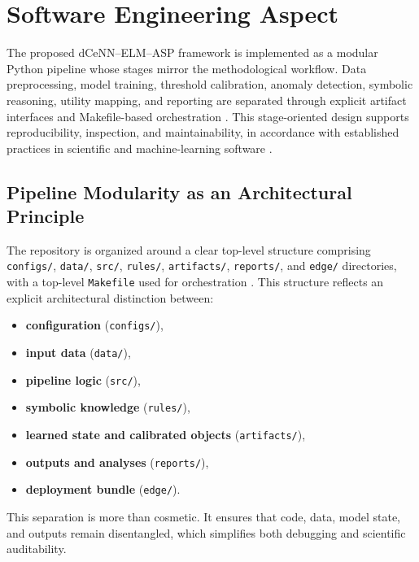 
\section{Software Engineering Aspect}
\label{sec:software_engineering_aspect}

The proposed dCeNN--ELM--ASP framework is implemented as a modular Python pipeline whose stages mirror the methodological workflow. Data preprocessing, model training, threshold calibration, anomaly detection, symbolic reasoning, utility mapping, and reporting are separated through explicit artifact interfaces and Makefile-based orchestration \cite{repo_thesis_grid_anomaly}. This stage-oriented design supports reproducibility, inspection, and maintainability, in accordance with established practices in scientific and machine-learning software \cite{wilson2014best,wilson2017good,elmenreich:repoducibility, bousbiat:TII2022,sculley2015debt}.

\subsection{Pipeline Modularity as an Architectural Principle}

The repository is organized around a clear top-level structure comprising \texttt{configs/}, \texttt{data/}, \texttt{src/}, \texttt{rules/}, \texttt{artifacts/}, \texttt{reports/}, and \texttt{edge/} directories, with a top-level \texttt{Makefile} used for orchestration \cite{repo_thesis_grid_anomaly}. This structure reflects an explicit architectural distinction between:
\begin{itemize}
	\item \textbf{configuration} (\texttt{configs/}),
	\item \textbf{input data} (\texttt{data/}),
	\item \textbf{pipeline logic} (\texttt{src/}),
	\item \textbf{symbolic knowledge} (\texttt{rules/}),
	\item \textbf{learned state and calibrated objects} (\texttt{artifacts/}),
	\item \textbf{outputs and analyses} (\texttt{reports/}),
	\item \textbf{deployment bundle} (\texttt{edge/}).
\end{itemize}
This separation is more than cosmetic. It ensures that code, data, model state, and outputs remain disentangled, which simplifies both debugging and scientific auditability.

